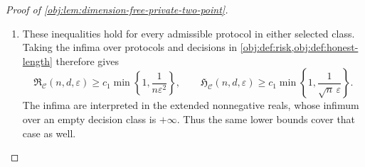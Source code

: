\begin{proof}[Proof of \cref{obj:lem:dimension-free-private-two-point}]
\begin{enumerate}
\item These inequalities hold for every admissible protocol in either selected class. Taking the infima over protocols and decisions in
\cref{obj:def:risk,obj:def:honest-length} therefore gives
\[
\mathfrak R_{\mathcal C}(n,d,\varepsilon)
\ge
c_1\min\left\{1,\frac1{n\varepsilon^2}\right\},
\qquad
\mathfrak H_{\mathcal C}(n,d,\varepsilon)
\ge
c_1\min\left\{1,\frac1{\sqrt n\,\varepsilon}\right\}.
\]
The infima are interpreted in the extended nonnegative reals, whose infimum over an empty decision class is \(+\infty\). Thus the same lower bounds cover that case as well.
\end{enumerate}
\end{proof}
